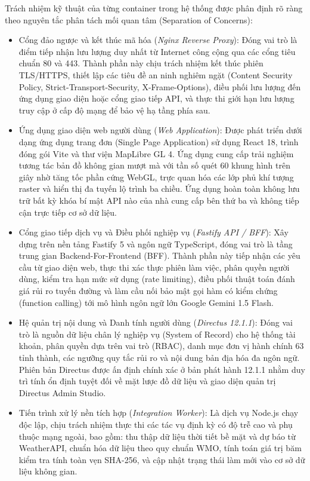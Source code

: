 Trách nhiệm kỹ thuật của từng container trong hệ thống được phân định rõ ràng theo nguyên tắc phân tách mối quan tâm (Separation of Concerns):
\begin{itemize}
    \item[-] Cổng đảo ngược và kết thúc mã hóa (\textit{Nginx Reverse Proxy}): Đóng vai trò là điểm tiếp nhận lưu lượng duy nhất từ Internet công cộng qua các cổng tiêu chuẩn 80 và 443. Thành phần này chịu trách nhiệm kết thúc phiên TLS/HTTPS, thiết lập các tiêu đề an ninh nghiêm ngặt (Content Security Policy, Strict-Transport-Security, X-Frame-Options), điều phối lưu lượng đến ứng dụng giao diện hoặc cổng giao tiếp API, và thực thi giới hạn lưu lượng truy cập ở cấp độ mạng để bảo vệ hạ tầng phía sau.
    \item[-] Ứng dụng giao diện web người dùng (\textit{Web Application}): Được phát triển dưới dạng ứng dụng trang đơn (Single Page Application) sử dụng React 18, trình đóng gói Vite và thư viện MapLibre GL 4. Ứng dụng cung cấp trải nghiệm tương tác bản đồ không gian mượt mà với tần số quét 60 khung hình trên giây nhờ tăng tốc phần cứng WebGL, trực quan hóa các lớp phủ khí tượng raster và hiển thị đa tuyến lộ trình ba chiều. Ứng dụng hoàn toàn không lưu trữ bất kỳ khóa bí mật API nào của nhà cung cấp bên thứ ba và không tiếp cận trực tiếp cơ sở dữ liệu.
    \item[-] Cổng giao tiếp dịch vụ và Điều phối nghiệp vụ (\textit{Fastify API / BFF}): Xây dựng trên nền tảng Fastify 5 và ngôn ngữ TypeScript, đóng vai trò là tầng trung gian Backend-For-Frontend (BFF). Thành phần này tiếp nhận các yêu cầu từ giao diện web, thực thi xác thực phiên làm việc, phân quyền người dùng, kiểm tra hạn mức sử dụng (rate limiting), điều phối thuật toán đánh giá rủi ro tuyến đường và làm cầu nối bảo mật gọi hàm có kiểm chứng (function calling) tới mô hình ngôn ngữ lớn Google Gemini 1.5 Flash.
    \item[-] Hệ quản trị nội dung và Danh tính người dùng (\textit{Directus 12.1.1}): Đóng vai trò là nguồn dữ liệu chân lý nghiệp vụ (System of Record) cho hệ thống tài khoản, phân quyền dựa trên vai trò (RBAC), danh mục đơn vị hành chính 63 tỉnh thành, các ngưỡng quy tắc rủi ro và nội dung bản địa hóa đa ngôn ngữ. Phiên bản Directus được ấn định chính xác ở bản phát hành 12.1.1 nhằm duy trì tính ổn định tuyệt đối về mặt lược đồ dữ liệu và giao diện quản trị Directus Admin Studio.
    \item[-] Tiến trình xử lý nền tích hợp (\textit{Integration Worker}): Là dịch vụ Node.js chạy độc lập, chịu trách nhiệm thực thi các tác vụ định kỳ có độ trễ cao và phụ thuộc mạng ngoài, bao gồm: thu thập dữ liệu thời tiết bề mặt và dự báo từ WeatherAPI, chuẩn hóa dữ liệu theo quy chuẩn WMO, tính toán giá trị băm kiểm tra tính toàn vẹn SHA-256, và cập nhật trạng thái làm mới vào cơ sở dữ liệu không gian.

\end{itemize}
